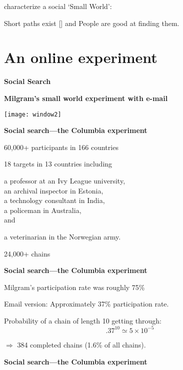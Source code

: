   characterize a social `Small World':

  
   Short paths exist
  [] and 
   People are good at finding them.
  


\section{An online experiment}


  \textbf{Social Search}


  \textbf{Milgram's small world experiment with e-mail\cite{dodds2003b}}
    \begin{center}
      \texttt{[image: window2]}
    \end{center}
  


  \textbf{Social search---the Columbia experiment}

  
   
    60,000+ participants in 166 countries
   
    18 targets in 13 countries including
    
     
      a professor at an Ivy League university,\\
     
      an archival inspector in Estonia,\\
     
      a technology consultant in India,\\
     
      a policeman in Australia,\\
    [] 
      and 
     
      a veterinarian in the Norwegian army.
    
  
    24,000+ chains
  


  \textbf{Social search---the Columbia experiment}

  
  
    Milgram's participation rate was roughly 75\%
  
    Email version: Approximately 37\% participation rate.
  
    Probability of a chain of length 10 getting through:
    $$.37^{10} \simeq 5 \times 10^{-5}$$
  
  $\Rightarrow$ 384 completed chains (1.6\% of all chains).
  
  

  \textbf{Social search---the Columbia experiment}

